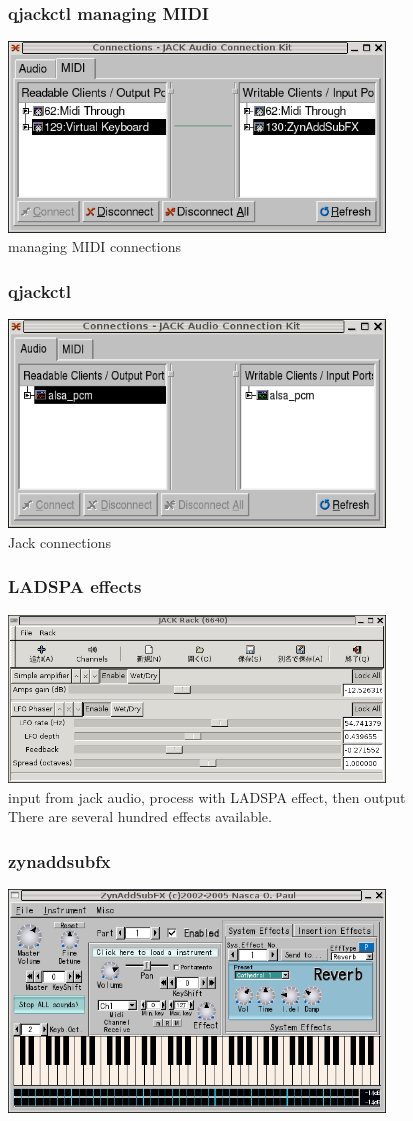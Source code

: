 \documentclass[dvipdfmx]{beamer}
\begin{document}
\begin{frame}
 \frametitle{qjackctl managing MIDI}
 \includegraphics[width=10cm]{image200602/qjackctl-midi.png}\\
managing MIDI connections
\end{frame}

\begin{frame}
 \frametitle{qjackctl}
\includegraphics[width=10cm]{image200602/qjackctl-2.png}\\
 Jack connections
\end{frame}

\begin{frame}
 \frametitle{LADSPA effects}
\includegraphics[width=10cm]{image200602/jack-rack.png}\\
input from jack audio, process with LADSPA effect, then output\\
There are several hundred effects available.
\end{frame}

\begin{frame}
 \frametitle{zynaddsubfx}
\includegraphics[width=10cm]{image200602/zynaddsubfx.png}
\end{frame}
\end{document}
